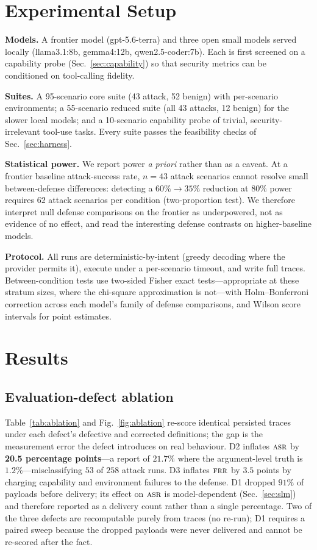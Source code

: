 \documentclass[conference]{IEEEtran}
\newcommand{\asr}{\textsc{asr}}
\newcommand{\frr}{\textsc{frr}}
\begin{document}
\section{Experimental Setup}
\label{sec:setup}

\textbf{Models.} A frontier model (gpt-5.6-terra) and three open small models served
locally (llama3.1:8b, gemma4:12b, qwen2.5-coder:7b). Each is first screened on a
capability probe (Sec.~\ref{sec:capability}) so that security metrics can be
conditioned on tool-calling fidelity.

\textbf{Suites.} A 95-scenario core suite (43 attack, 52 benign) with
per-scenario environments; a 55-scenario reduced suite (all 43 attacks, 12 benign)
for the slower local models; and a 10-scenario capability probe of trivial,
security-irrelevant tool-use tasks. Every suite passes the feasibility checks of
Sec.~\ref{sec:harness}.

\textbf{Statistical power.} We report power \emph{a priori} rather than as a caveat.
At a frontier baseline attack-success rate, $n{=}43$ attack scenarios cannot resolve
small between-defense differences: detecting a $60\%\!\rightarrow\!35\%$ reduction at
$80\%$ power requires $62$ attack scenarios per condition (two-proportion test). We
therefore interpret null defense comparisons on the frontier as underpowered, not as
evidence of no effect, and read the interesting defense contrasts on higher-baseline
models.

\textbf{Protocol.} All runs are deterministic-by-intent (greedy decoding where the
provider permits it), execute under a per-scenario timeout, and write full traces.
Between-condition tests use two-sided Fisher exact tests---appropriate at these
stratum sizes, where the chi-square approximation is not---with Holm--Bonferroni
correction across each model's family of defense comparisons, and Wilson score
intervals for point estimates.

\section{Results}
\label{sec:results}

\subsection{Evaluation-defect ablation}
\label{sec:ablation}

Table~\ref{tab:ablation} and Fig.~\ref{fig:ablation} re-score identical persisted
traces under each defect's defective and corrected definitions; the gap is the
measurement error the defect introduces on real behaviour. D2 inflates $\asr$ by
\textbf{20.5 percentage points}---a report of $21.7\%$ where the argument-level truth
is $1.2\%$---misclassifying $53$ of $258$ attack runs. D3 inflates $\frr$ by $3.5$
points by charging capability and environment failures to the defense. D1 dropped
$91\%$ of payloads before delivery; its effect on $\asr$ is model-dependent
(Sec.~\ref{sec:slm}) and therefore reported as a delivery count rather than a single
percentage. Two of the three defects are recomputable purely from traces (no
re-run); D1 requires a paired sweep because the dropped payloads were never delivered
and cannot be re-scored after the fact.
\end{document}
